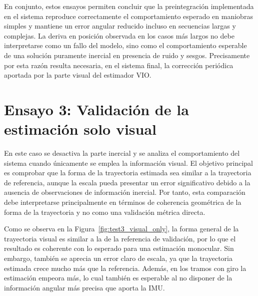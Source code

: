 En conjunto, estos ensayos permiten concluir que la preintegraci\'on implementada en el sistema reproduce 
correctamente el comportamiento esperado en maniobras simples y mantiene un error angular reducido incluso en secuencias largas y complejas. La deriva en posici\'on observada en los casos m\'as largos no debe 
interpretarse como un fallo del modelo, sino como el comportamiento esperable de una soluci\'on puramente inercial en 
presencia de ruido y sesgos. Precisamente por esta raz\'on resulta necesaria, en el sistema final, 
la correcci\'on peri\'odica aportada por la parte visual del estimador VIO.

\section{Ensayo 3: Validaci\'on de la estimaci\'on solo visual}
En este caso se desactiva la parte inercial y se analiza el comportamiento del sistema cuando \'unicamente se emplea la 
informaci\'on visual. El objetivo principal es comprobar que la forma de la trayectoria estimada sea similar a la 
trayectoria de referencia, aunque la escala pueda presentar un error significativo debido a la ausencia de observaciones de 
informaci\'on inercial. Por tanto, esta comparaci\'on debe interpretarse principalmente en t\'erminos de coherencia geom\'etrica de la forma de la trayectoria y no como una validaci\'on m\'etrica directa.

Como se observa en la Figura~\ref{fig:test3_visual_only}, la forma general de la trayectoria visual es similar a la de la 
referencia de validaci\'on, por lo que el resultado es coherente con lo esperado para una estimaci\'on monocular. Sin embargo, tambi\'en 
se aprecia un error claro de escala, ya que la trayectoria estimada crece mucho m\'as que la referencia. Adem\'as, en los tramos 
con giro la estimaci\'on empeora m\'as, lo cual tambi\'en es esperable al no disponer de la informaci\'on angular m\'as 
precisa que aporta la IMU.


